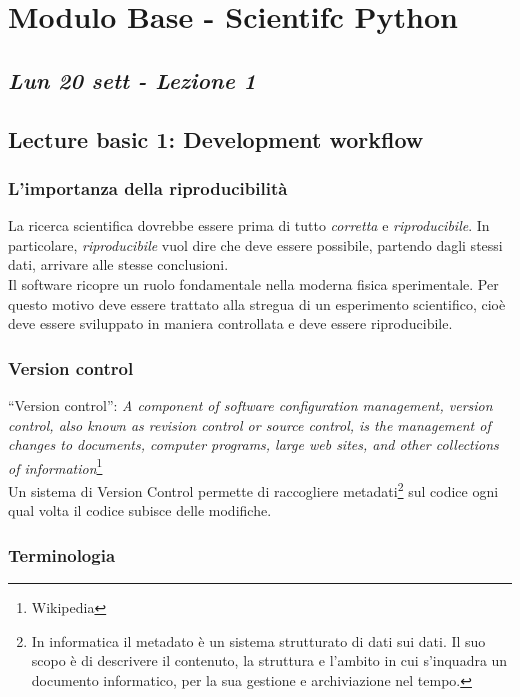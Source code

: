 \chapter{Modulo Base - Scientifc Python}
\section{\textit{Lun 20 sett - Lezione 1}}
\section{Lecture basic 1: Development workflow}

\subsection{L'importanza della riproducibilità}
La ricerca scientifica dovrebbe essere prima di tutto \textit{corretta} e \textit{riproducibile}. In particolare, \textit{riproducibile} vuol dire che deve essere possibile, partendo dagli stessi dati, arrivare alle stesse conclusioni.\\
Il software ricopre un ruolo fondamentale nella moderna fisica sperimentale. Per questo motivo deve essere trattato alla stregua di un esperimento scientifico, cioè deve essere sviluppato in maniera controllata e deve essere riproducibile.




\subsection{Version control}

“Version control”: \textit{A component of software configuration
management, version control, also known as revision control or
source control, is the management of changes to documents,
computer programs, large web sites, and other collections of
information}\footnote{Wikipedia}\\

Un sistema di Version Control permette di raccogliere metadati\footnote{In informatica il metadato è un sistema strutturato di dati sui dati. Il suo scopo è di descrivere il contenuto, la struttura e l’ambito in cui s’inquadra un documento informatico, per la sua gestione e archiviazione nel tempo.} sul codice ogni qual volta il codice subisce delle modifiche.


\subsection{Terminologia}

